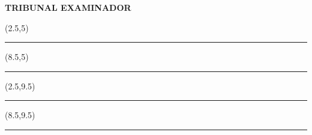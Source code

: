 \newpage
\begin{center}
   \textbf{TRIBUNAL EXAMINADOR} 

    \begin{textblock}{5}(2.5,5)
    \noindent\rule{6.5cm}{0.4pt}
    \end{textblock}
    
    \begin{textblock}{5}(8.5,5)
    \noindent\rule{6.5cm}{0.4pt}
    \end{textblock}
    
    \begin{textblock}{5}(2.5,9.5)
    \noindent\rule{6.5cm}{0.4pt}
    \end{textblock}
    
    \begin{textblock}{5}(8.5,9.5)
    \noindent\rule{6.5cm}{0.4pt}
    \end{textblock}

\end{center}